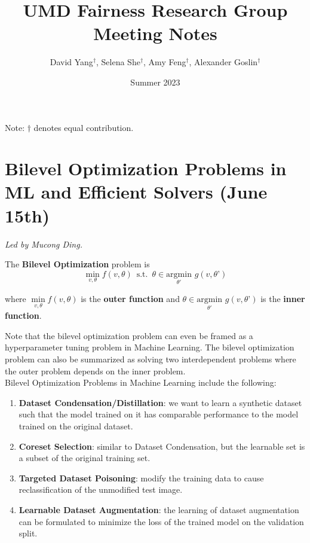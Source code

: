 \documentclass[12pt]{amsart}
\title{UMD Fairness Research Group Meeting Notes}
\author{David Yang$^{\dagger}$, Selena She$^{\dagger}$, Amy Feng$^{\dagger}$, Alexander Goslin$^{\dagger}$}
\date{Summer 2023}
\begin{document}
\maketitle

\begin{center}
    Note: $\dagger$ denotes equal contribution.
\end{center}

\section{Bilevel Optimization Problems in ML and Efficient Solvers (June 15th)}

\textit{Led by Mucong Ding.} \\

\begin{definition}
The \textbf{Bilevel Optimization} problem is 
\[\min_{v, \theta} f(v, \theta) \, \text{   s.t.  } \, \theta \in \underset{\theta'}{\mathrm{argmin}} \, \, g(v, \theta’)\]

\noindent where $\underset{v, \theta}\min f(v, \theta)$ is the \textbf{outer function} and $\theta \in \underset{\theta'}{\mathrm{argmin}} \, \, g(v, \theta’)$ is the \textbf{inner function}.
\end{definition}

Note that the bilevel optimization problem can even be framed as a hyperparameter tuning problem in Machine Learning. The bilevel optimization problem can also be summarized as solving two interdependent problems where the outer problem depends on the inner problem. \\

Bilevel Optimization Problems in Machine Learning include the following:
\begin{enumerate}
    \item \textbf{Dataset Condensation/Distillation}: we want to learn a synthetic dataset such that the model trained on it has comparable performance to the model trained on the original dataset.
    \item \textbf{Coreset Selection}: similar to Dataset Condensation, but the learnable set is a subset of the original training set.
    \item \textbf{Targeted Dataset Poisoning}: modify the training data to cause reclassification of the unmodified test image.
    \item \textbf{Learnable Dataset Augmentation}: the learning of dataset augmentation can be formulated to minimize the loss of the trained model on the validation split.
\end{enumerate}
\end{document}
